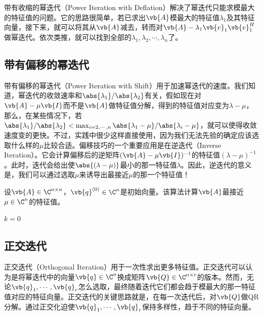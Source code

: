 带有收缩的幂迭代（Power Iteration with Deflation）解决了幂迭代只能求模最大的特征值的问题。它的思路很简单，若已求出$\vb{A}$模最大的特征值$\lambda_1$及其特征向量，接下来，就可以将其从$\vb{A}$减去，转而对$\vb{A}-\lambda_1\vb{v}_1\vb{v}_1^H$做幂迭代。依次类推，就可以找到全部的$\lambda_1,\lambda_2,\cdots,\lambda_n$了。

\subsection{带有偏移的幂迭代}

带有偏移的幂迭代（Power Iteration with Shift）用于加速幂迭代的速度。我们知道，幂迭代的收敛速率和$\abs{\lambda_1}/\abs{\lambda_2}$有关，假如现在对$\vb{A}-\mu\vb{I}$而不是$\vb{A}$做特征值分解，得到的特征值对应变为$\lambda-\mu$，那么，在某些情况下，若$\abs{\lambda_1}/\abs{\lambda_2}<\max_{i=2,\cdots,n}\abs{\lambda_1-\mu}/\abs{\lambda_i-\mu}$，就可以使得收敛速度变的更快。不过，实践中很少这样直接使用，因为我们无法先验的确定应该选取什么样的$\mu$比较合适。偏移技巧的一个重要应用是在逆迭代（Inverse Iteration）。它会计算偏移后的逆矩阵$(\vb{A}-\mu\vb{I})^{-1}$的特征值$(\lambda-\mu)^{-1}$。此时，迭代会给出使$\abs{(\lambda-\mu)}$最小的那一特征值$\lambda$。因此，逆迭代的意义是，我们可以通过选取$\mu$来诱导出最接近$\mu$的那一个特征值！

\begin{BoxAlgorithm}[逆迭代]
    设$\vb{A}\in\C^{n\times n}$，$\vb{q}^{(0)}\in\C^n$是初始向量。该算法计算$\vb{A}$最接近$\mu\in\C^n$的特征值。
    \begin{Algoplain}
        $k=0$\;
    \end{Algoplain}
\end{BoxAlgorithm}

\subsection{正交迭代}

正交迭代（Orthogonal Iteration）用于一次性求出更多特征值。正交迭代可以认为是将幂迭代中的向量$\vb{q}\in\C^n$换成矩阵$\vb{Q}\in\C^{n\times r}$的版本。然而，无论$\vb{q}_1,\cdots,\vb{q}_r$怎么选取，最终随着迭代它们都会趋于模最大的那一特征值对应的特征向量。正交迭代的关键思路就是，在每一次迭代后，对$\vb{Q}$做QR分解。通过正交化迫使$\vb{q}_1,\cdots,\vb{q}_r$保持多样性，趋于不同的特征向量。

